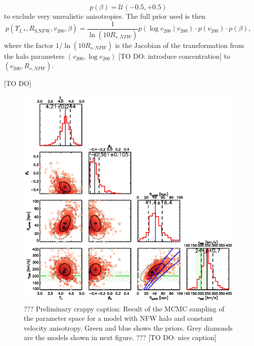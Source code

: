 \begin{equation*}
p(\beta) = \mathscr{U}(-0.5,+0.5)
\end{equation*}
to exclude very unrealistic anisotropies. The full prior used is then
\begin{equation*}
p(\Upsilon_{I,*},R_\text{S,NFW},v_{200},\beta) = \frac{1}{\ln\left( 10 R_{s,NFW}\right)} p(\log c_{200} \mid v_{200}) \cdot p(v_{200}) \cdot p(\beta), 
\end{equation*}
where the factor $1/\ln\left( 10 R_{s,NFW}\right)$ is the Jacobian of the transformation from the halo parameters $(v_{200},\log c_{200})$ [TO DO: introduce concentration] to $(v_{200},R_{s,NFW})$.


[TO DO]

\begin{figure}
\centering
\includegraphics[width=0.9\linewidth]{fig/B4_contour_plot_short.ps}
\caption{??? Preliminary crappy caption: Result of the MCMC sampling of the parameter space for a model with NFW halo and constant velocity anisotropy. Green and blue shows the priors. Grey diamonds are the models shown in next figure. ??? [TO DO: nice caption]}
\label{fig:???}
\end{figure}

